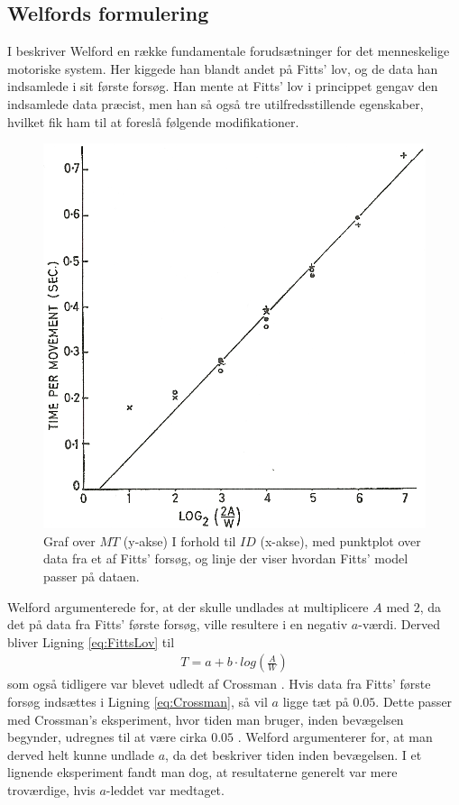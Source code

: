 \subsection*{Welfords formulering}

I \cite{welford1968} beskriver Welford en række fundamentale forudsætninger for det menneskelige motoriske system. Her kiggede han blandt andet på Fitts' lov, og de data han indsamlede i sit første forsøg. Han mente at Fitts' lov i princippet gengav den indsamlede data præcist, men han så også tre utilfredsstillende egenskaber, hvilket fik ham til at foreslå følgende modifikationer.
\begin{figure}[h]
\centering
\includegraphics[width=.5\linewidth]{images/illustrations/welford_plot_1}
\caption{Graf over $MT$ (y-akse) I forhold til $ID$ (x-akse), med punktplot over data fra et af Fitts' forsøg, og linje der viser hvordan Fitts' model passer på dataen.}
\label{fig:WelfordGraf}
\end{figure}
Welford argumenterede for, at der skulle undlades at multiplicere $A$ med $2$, da det på data fra Fitts' første forsøg, ville resultere i en negativ $a$-værdi. Derved bliver Ligning \ref{eq:FittsLov} til
\begin{align}
\label{eq:Crossman}
T = a + b \cdot log\left(\frac{A}{W}\right)
\end{align}
som også tidligere var blevet udledt af Crossman \cite{crossman1957}. Hvis data fra Fitts' første forsøg indsættes i Ligning \ref{eq:Crossman}, så vil $a$ ligge tæt på $0.05$. Dette passer med Crossman's eksperiment, hvor tiden man bruger, inden bevægelsen begynder, udregnes til at være cirka $0.05$ \cite{crossman1957}. Welford argumenterer for, at man derved helt kunne undlade $a$, da det beskriver tiden inden bevægelsen. I et lignende eksperiment \cite{welford1958} fandt man dog, at resultaterne generelt var mere troværdige, hvis $a$-leddet var medtaget.

